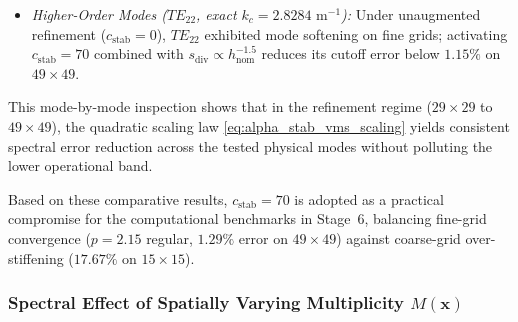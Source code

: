 \documentclass[VANCOUVER,Times1COL]{WileyNJD-v5}
\begin{document}
\begin{enumerate}
\begin{itemize}
    \item \emph{Higher-Order Modes ($TE_{22}$, exact $k_c = 2.8284\text{ m}^{-1}$):} Under unaugmented refinement ($c_{\mathrm{stab}} = 0$), $TE_{22}$ exhibited mode softening on fine grids; activating $c_{\mathrm{stab}} = 70$ combined with $s_{\mathrm{div}} \propto h_{\mathrm{nom}}^{-1.5}$ reduces its cutoff error below $1.15\%$ on $49 \times 49$.
\end{itemize}
This mode-by-mode inspection shows that in the refinement regime ($29\times 29$ to $49\times 49$), the quadratic scaling law \eqref{eq:alpha_stab_vms_scaling} yields consistent spectral error reduction across the tested physical modes without polluting the lower operational band.
\end{enumerate}

Based on these comparative results, $c_{\mathrm{stab}} = 70$ is adopted as a practical compromise for the computational benchmarks in Stage~6, balancing fine-grid convergence ($p = 2.15$ regular, $1.29\%$ error on $49\times 49$) against coarse-grid over-stiffening ($17.67\%$ on $15\times 15$).

\subsubsection{Spectral Effect of Spatially Varying Multiplicity $M(\mathbf{x})$}
\label{subsubsec:multiplicity_rayleigh_effect}
\end{document}
